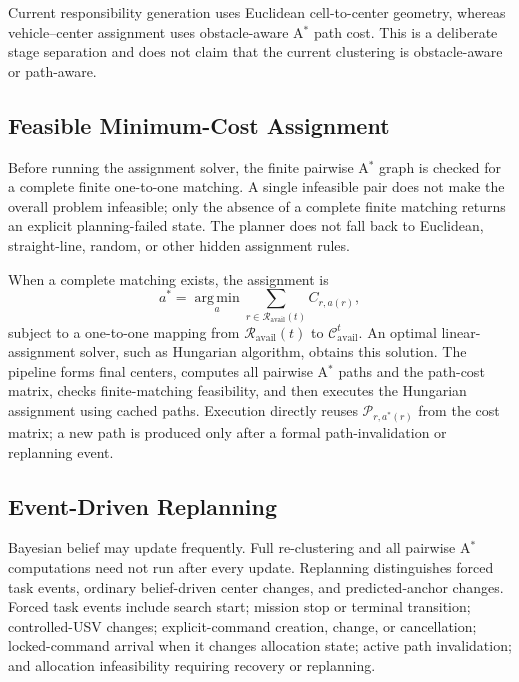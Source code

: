 \documentclass[letterpaper, 10pt, conference]{ieeeconf}
\begin{document}
Current responsibility generation uses Euclidean cell-to-center geometry, whereas vehicle--center assignment uses obstacle-aware A\(^\ast\) path cost. This is a deliberate stage separation and does not claim that the current clustering is obstacle-aware or path-aware.

\subsection{Feasible Minimum-Cost Assignment}

Before running the assignment solver, the finite pairwise A\(^\ast\) graph is checked for a complete finite one-to-one matching. A single infeasible pair does not make the overall problem infeasible; only the absence of a complete finite matching returns an explicit planning-failed state. The planner does not fall back to Euclidean, straight-line, random, or other hidden assignment rules.

When a complete matching exists, the assignment is
\begin{equation}
  a^\ast = \operatorname*{arg\,min}_{a}
  \sum_{r\in\mathcal{R}_{\mathrm{avail}}(t)} C_{r,a(r)},
  \label{eq:minimum_cost_assignment}
\end{equation}
subject to a one-to-one mapping from \(\mathcal{R}_{\mathrm{avail}}(t)\) to \(\mathcal{C}_{\mathrm{avail}}^t\). An optimal linear-assignment solver, such as Hungarian algorithm, obtains this solution. The pipeline forms final centers, computes all pairwise A\(^\ast\) paths and the path-cost matrix, checks finite-matching feasibility, and then executes the Hungarian assignment using cached paths. Execution directly reuses \(\mathcal{P}_{r,a^\ast(r)}\) from the cost matrix; a new path is produced only after a formal path-invalidation or replanning event.

\subsection{Event-Driven Replanning}

Bayesian belief may update frequently. Full re-clustering and all pairwise A\(^\ast\) computations need not run after every update. Replanning distinguishes forced task events, ordinary belief-driven center changes, and predicted-anchor changes. Forced task events include search start; mission stop or terminal transition; controlled-USV changes; explicit-command creation, change, or cancellation; locked-command arrival when it changes allocation state; active path invalidation; and allocation infeasibility requiring recovery or replanning.
\end{document}
